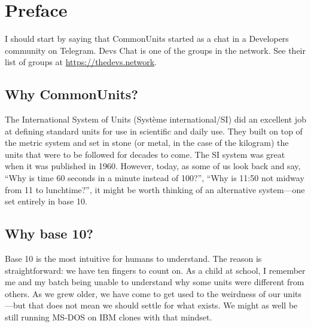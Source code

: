 \chapter*{Preface}

I should start by saying that CommonUnits started as a chat in a Developers community on Telegram.
Devs Chat is one of the groups in the  network. See their list of groups at \url{https://thedevs.network}.

\section*{Why CommonUnits?}
The International System of Units (Système international/SI) did an excellent job at defining standard units for use in scientific and daily use. They built on top of the metric system and set in stone (or metal, in the case of the kilogram) the units that were to be followed for decades to come.
The SI system was great when it was published in 1960.
However, today, as some of us look back and say, ``Why is time 60 seconds in a minute instead of 100?'', ``Why is 11:50 not midway from 11 to lunchtime?'', it might be worth thinking of an alternative system—one set entirely in base 10.

\section*{Why base 10?}
Base 10 is the most intuitive for humans to understand. The reason is straightforward: we have ten fingers to count on. As a child at school, I remember me and my batch being unable to understand why some units were different from others. As we grew older, we have come to get used to the weirdness of our units—but that does not mean we should settle for what exists. We might as well be still running MS-DOS on IBM clones with that mindset.

